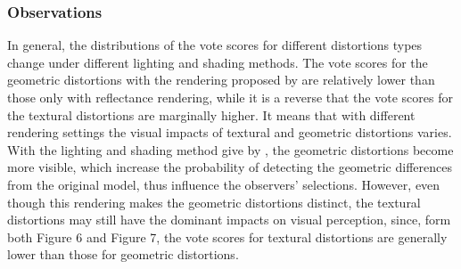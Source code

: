 \subsubsection{Observations}
In general, the distributions of the vote scores for different distortions types change under different lighting and shading methods. The vote scores for the geometric distortions with the rendering proposed by \cite{Rogowitz_2001} are relatively lower than those only with reflectance rendering, while it is a reverse that the vote scores for the textural distortions are marginally higher. It means that with different rendering settings the visual impacts of textural and geometric distortions varies. With the lighting and shading method give by \cite{Rogowitz_2001}, the geometric distortions become more visible, which increase the probability of detecting the geometric differences from the original model, thus influence the observers’ selections. However, even though this rendering makes the geometric distortions distinct, the textural distortions may still have the dominant impacts on visual perception, since, form both Figure 6 and Figure 7, the vote scores for textural distortions are generally lower than those for geometric distortions.